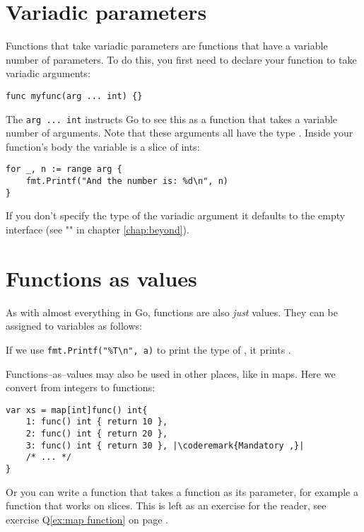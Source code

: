\section{Variadic parameters}
Functions that take variadic parameters are functions that have a
variable number of parameters. To do this, you first
need to declare your function to take variadic arguments:
\begin{lstlisting}[caption=Variadac function declaration]
func myfunc(arg ... int) {}
\end{lstlisting}
The \lstinline{arg ... int} instructs Go to see this as a function that
takes a variable number of arguments. Note that these arguments all
have the type . Inside your function's body the variable
 is a slice of ints:
\begin{lstlisting}
for _, n := range arg {
    fmt.Printf("And the number is: %d\n", n)
}
\end{lstlisting}

If you don't specify the type of the variadic argument it defaults to the
empty interface  (see "" in
chapter \ref{chap:beyond}).

\section{Functions as values}
\label{sec:functions as values}
As with almost everything in Go, functions are also \emph{just} values.
They can be assigned to variables as follows:

If we use \lstinline{fmt.Printf("%T\n", a)} to print the type of
, it prints .

Functions--as--values may also be used in other places, like in maps.
Here we convert from integers to functions:
\begin{lstlisting}[caption=Functions as values in maps]
var xs = map[int]func() int{
    1: func() int { return 10 },
    2: func() int { return 20 },
    3: func() int { return 30 }, |\coderemark{Mandatory ,}|
    /* ... */
}
\end{lstlisting}
Or you can write a function that takes a function as its parameter, for
example a  function that works on  slices. This is
left as an exercise for the reader, see exercise Q\ref{ex:map function}
on page \pageref{ex:map function}.

